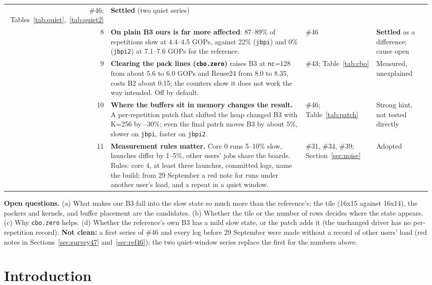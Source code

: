\documentclass[11pt,a4paper]{article}
\newcommand{\good}[1]{\textcolor{green!45!black}{\textbf{#1}}}
\newcommand{\slow}[1]{\textcolor{red!70!black}{#1}}
\begin{document}
{\begin{tabularx}{\linewidth}{@{}r >{\raggedright\arraybackslash}X >{\raggedright\arraybackslash}p{2.6cm} >{\raggedright\arraybackslash}p{2.9cm}@{}}
\#46; Tables~\ref{tab:quiet},~\ref{tab:quiet2} & \good{Settled} (two quiet series) \\
8 & \textbf{On plain B3 ours is far more affected}: 87--89\% of repetitions slow at 4.4--4.5 GOPs, against 22\% (\texttt{jbpi}) and 0\% (\texttt{jbpi2}) at
7.1--7.6 GOPs for the reference. & \#46 & \good{Settled} as a difference; cause open \\
9 & \textbf{Clearing the pack lines (\texttt{cbo.zero})} raises B3 at \texttt{nc}=128 from about 5.6 to 6.0 GOPs and Reuse24 from 8.0 to 8.35, costs B2 about 0.15;
the counters show it does not work the way intended. Off by default. & \#43; Table~\ref{tab:cbo} & Measured, \slow{unexplained} \\
10 & \textbf{Where the buffers sit in memory changes the result.} A per-repetition patch that shifted the heap changed B3 with K=256 by --30\%; even the final
patch moves B3 by about 5\%, slower on \texttt{jbpi}, faster on \texttt{jbpi2}. & \#46; Table~\ref{tab:patch} & Strong hint, \slow{not tested directly} \\
11 & \textbf{Measurement rules matter.} Core 0 runs 5--10\% slow, launches differ by 1--5\%, other users' jobs share the boards. Rules: core 4, at least three launches,
committed logs, name the build; from 29 September a red note for runs under another user's load, and a repeat in a quiet window. & \#31, \#34, \#39;
Section~\ref{sec:noise} & Adopted \\
\bottomrule
\end{tabularx}}

\textbf{Open questions.} (a) What makes our B3 fall into the slow state so much more than the reference's; the tile (16x15 against 16x14), the
packers and kernels, and buffer placement are the candidates. (b) Whether the tile or the number of rows decides where the state appears. (c) Why
\texttt{cbo.zero} helps. (d) Whether the reference's own B3 has a mild slow state, or the patch adds it (the unchanged driver has no per-repetition record).
\textbf{Not clean:} a first series of \#46 and every log before 29 September were made without a record of other users' load (red notes in
Sections~\ref{sec:survey47} and~\ref{sec:ref46}); the two quiet-window series replace the first for the numbers above.
\newpage

\section{Introduction}
\end{document}
